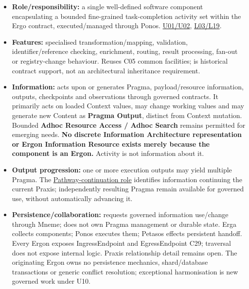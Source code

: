 \begin{itemize}


\item \textbf{Role/responsibility:} a single well-defined software component encapsulating
  a bounded fine-grained task-completion activity set within the Ergo contract,
  executed/managed through Ponos. \href{\detokenize{../../../../../../../../docs/markdown/05-information-systems-architecture/sources.md#u02}}{U01/U02}, \href{\detokenize{../../../../../../../../docs/markdown/05-information-systems-architecture/sources.md#l03}}{L03/L19}.

\item \textbf{Features:} specialised transformation/mapping, validation, identifier/reference
  checking, enrichment, routing, result processing, fan-out or registry-change
  behaviour. Reuses C05 common facilities; \texttt{} is historical contract
  support, not an architectural inheritance requirement.

\item \textbf{Information:} acts upon or generates Pragma, payload/resource information,
  outputs, checkpoints and observations through governed contracts. It primarily
  acts on loaded Context values, may change working values and may generate new
  Content as \textbf{Pragma Output}, distinct from Context mutation. Bounded \textbf{Adhoc
  Resource Access / Adhoc Search} remains permitted for emerging needs. \textbf{No discrete
  Information Architecture representation or Ergon Information Resource exists
  merely because the component is an Ergon.} Activity is not information about it.

\item \textbf{Output progression:} one or more execution outputs may yield multiple Pragma.
  The \hyperref[element:27ad143e7c784e378556af8a57c438f7]{Pathway-continuation role}
  identifies information continuing the current Praxis; independently resulting
  Pragma remain available for governed use, without automatically advancing it.

\item \textbf{Persistence/collaboration:} requests governed information use/change through
  Mneme; does not own Pragma management or durable state. Erga collects components;
  Ponos executes them; Petasos effects persistent handoff. Every Ergon exposes
  IngressEndpoint and EgressEndpoint C29; traversal does not expose internal logic.
  Praxis relationship detail remains open. The originating Ergon owns no persistence
  mechanics, shard/database transactions or generic conflict resolution; exceptional
  harmonisation is new governed work under U10.


\end{itemize}
